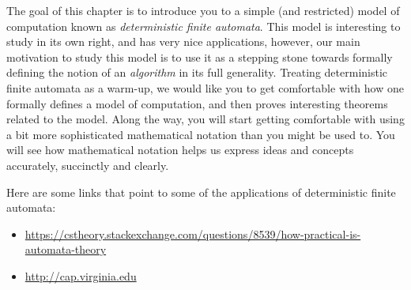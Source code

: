 \begin{preamble}
\label{prmbl:deterministic-finite-automata::goal}
The goal of this chapter is to introduce you to a simple (and restricted) model of computation known as \emph{deterministic finite automata}. This model is interesting to study in its own right, and has very nice applications, however, our main motivation to study this model is to use it as a stepping stone towards formally defining the notion of an \emph{algorithm} in its full generality. Treating deterministic finite automata as a warm-up, we would like you to get comfortable with how one formally defines a model of computation, and then proves interesting theorems related to the model. Along the way, you will start getting comfortable with using a bit more sophisticated mathematical notation than you might be used to. You will see how mathematical notation helps us express ideas and concepts accurately, succinctly and clearly.

Here are some links that point to some of the applications of deterministic finite automata:
\begin{itemize}
    \item \url{https://cstheory.stackexchange.com/questions/8539/how-practical-is-automata-theory}
    \item \url{http://cap.virginia.edu}
\end{itemize}

\end{preamble}

